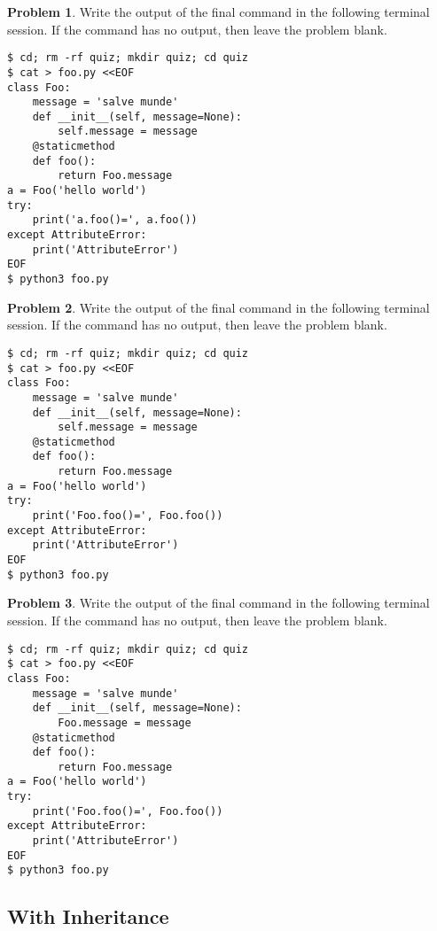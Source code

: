 \documentclass[10pt]{article}
\theoremstyle{definition}
\newtheorem{problem}{Problem}
\begin{document}
\filbreak
\begin{problem}
    Write the output of the final command in the following terminal session.
    If the command has no output, then leave the problem blank.
\end{problem}
\begin{lstlisting}
$ cd; rm -rf quiz; mkdir quiz; cd quiz
$ cat > foo.py <<EOF
class Foo:
    message = 'salve munde'
    def __init__(self, message=None):
        self.message = message
    @staticmethod
    def foo():
        return Foo.message
a = Foo('hello world')
try:
    print('a.foo()=', a.foo())
except AttributeError:
    print('AttributeError') 
EOF
$ python3 foo.py
\end{lstlisting}


\filbreak
\begin{problem}
    Write the output of the final command in the following terminal session.
    If the command has no output, then leave the problem blank.
\end{problem}
\begin{lstlisting}
$ cd; rm -rf quiz; mkdir quiz; cd quiz
$ cat > foo.py <<EOF
class Foo:
    message = 'salve munde'
    def __init__(self, message=None):
        self.message = message
    @staticmethod
    def foo():
        return Foo.message
a = Foo('hello world')
try:
    print('Foo.foo()=', Foo.foo())
except AttributeError:
    print('AttributeError') 
EOF
$ python3 foo.py
\end{lstlisting}


\filbreak
\begin{problem}
    Write the output of the final command in the following terminal session.
    If the command has no output, then leave the problem blank.
\end{problem}
\begin{lstlisting}
$ cd; rm -rf quiz; mkdir quiz; cd quiz
$ cat > foo.py <<EOF
class Foo:
    message = 'salve munde'
    def __init__(self, message=None):
        Foo.message = message
    @staticmethod
    def foo():
        return Foo.message
a = Foo('hello world')
try:
    print('Foo.foo()=', Foo.foo())
except AttributeError:
    print('AttributeError') 
EOF
$ python3 foo.py
\end{lstlisting}

\subsection{With Inheritance}
\end{document}
